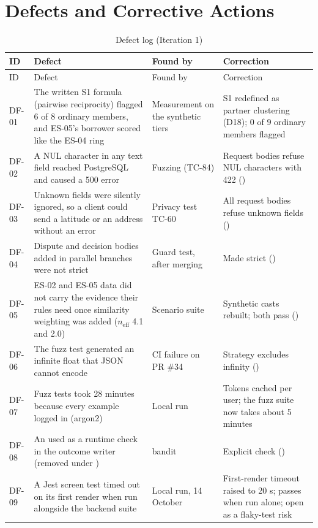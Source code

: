 \section{Defects and Corrective Actions}\label{sec:defects-corrective-actions}
\begingroup
\begin{longtable}{@{}L{22pt}L{149pt}L{68pt}L{132pt}@{}}
\caption{Defect log (Iteration 1)}\label{tab:defect-log-iteration-1}\\
\toprule
ID & Defect & Found by & Correction \\
\midrule
\endfirsthead
\toprule
ID & Defect & Found by & Correction \\
\midrule
\endhead
\bottomrule
\endlastfoot
DF-01 & The written S1 formula (pairwise reciprocity) flagged 6 of 8 ordinary members, and ES-05's borrower scored like the ES-04 ring & Measurement on the synthetic tiers & S1 redefined as partner clustering (D18); 0 of 9 ordinary members flagged \\
DF-02 & A NUL character in any text field reached PostgreSQL and caused a 500 error & Fuzzing (TC-84) & Request bodies refuse NUL characters with 422 () \\
DF-03 & Unknown fields were silently ignored, so a client could send a latitude or an address without an error & Privacy test TC-60 & All request bodies refuse unknown fields () \\
DF-04 & Dispute and decision bodies added in parallel branches were not strict & Guard test, after merging  & Made strict () \\
DF-05 & ES-02 and ES-05 data did not carry the evidence their rules need once similarity weighting was added ($n_{\mathrm{eff}}$ 4.1 and 2.0) & Scenario suite & Synthetic casts rebuilt; both pass () \\
DF-06 & The fuzz test generated an infinite float that JSON cannot encode & CI failure on PR \#34 & Strategy excludes infinity () \\
DF-07 & Fuzz tests took 28 minutes because every example logged in (argon2) & Local run & Tokens cached per user; the fuzz suite now takes about 5 minutes \\
DF-08 & An  used as a runtime check in the outcome writer (removed under ) & bandit & Explicit check () \\
DF-09 & A Jest screen test timed out on its first render when run alongside the backend suite & Local run, 14 October & First-render timeout raised to 20 s; passes when run alone; open as a flaky-test risk \\
\end{longtable}
\endgroup
